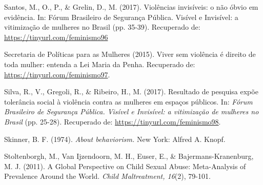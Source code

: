 \hangindent=25pt
\noindent Santos, M., O., P., \& Grelin, D., M. (2017). Violências invisíveis: o não óbvio em evidência. In: Fórum Brasileiro de Segurança Pública. Visível e Invisível: a vitimização de mulheres no Brasil (pp. 35-39). Recuperado de: \url{https://tinyurl.com/feminismo96}

\hangindent=25pt
\noindent Secretaria de Políticas para as Mulheres (2015). Viver sem violência é direito de toda mulher: entenda a Lei Maria da Penha. Recuperado de: \url{https://tinyurl.com/feminismo97}.

\hangindent=25pt
\noindent Silva, R., V., Gregoli, R., \& Ribeiro, H., M. (2017). Resultado de pesquisa expõe tolerância social à violência contra as mulheres em espaços públicos. In: \textit{Fórum Brasileiro de Segurança Pública. Visível e Invisível: a vitimização de mulheres no Brasil} (pp. 25-28). Recuperado de: \url{https://tinyurl.com/feminismo98}.

\hangindent=25pt
\noindent Skinner, B. F. (1974). \textit{About behaviorism.} New York: Alfred A. Knopf.

\hangindent=25pt
\noindent Stoltenborgh, M., Van Ijzendoorn, M. H., Euser, E., \& Bajermans-Kranenburg, M. J. (2011). A Global Perspective on Child Sexual Abuse: Meta-Analysis of Prevalence Around the World. \textit{Child Maltreatment, 16}(2), 79-101.
